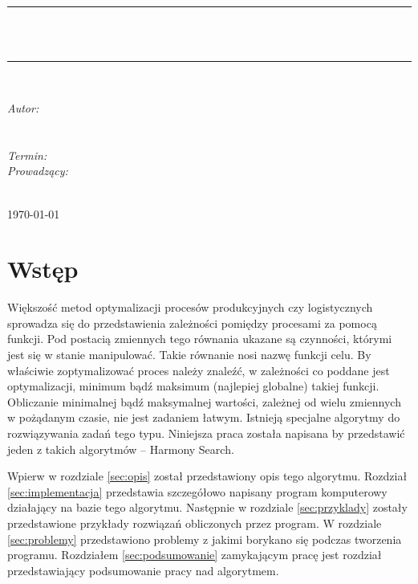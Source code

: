 \documentclass[10pt, a4paper]{article}
\begin{document}
\def\tablename{Tabela}	%
\begin{titlepage}
	\begin{center}
		\textsc{\LARGE \formakursu}\\[1cm]		
		\textsc{\Large \kurs}\\[0.5cm]		
		\rule{\textwidth}{0.08cm}\\[1cm]
		{\huge \bfseries \doctype}\\[1cm]
		\rule{\textwidth}{0.08cm}\\[1cm]
		\begin{flushright} \large
		\emph{Autor: }\\
		\osobaA\\
		\osobaB\\[0.4cm]
		\emph{Termin: }\termin\\[0.4cm]
		\emph{Prowadzący:} \\
		\prowadzacy \\
		\end{flushright}
		\vfill
		{\large \today}
	\end{center}	
\end{titlepage}
\newpage
\tableofcontents
\newpage

\section{Wstęp}
\label{sec:wstep}
Większość metod optymalizacji procesów produkcyjnych czy logistycznych sprowadza się do przedstawienia zależności pomiędzy procesami za pomocą funkcji. Pod postacią zmiennych tego równania ukazane są czynności, którymi jest się w stanie manipulować. Takie równanie nosi nazwę funkcji celu. By właściwie zoptymalizować proces należy znaleźć, w zależności co poddane jest optymalizacji, minimum bądź maksimum (najlepiej globalne) takiej funkcji. Obliczanie minimalnej bądź maksymalnej wartości, zależnej od wielu zmiennych w pożądanym czasie, nie jest zadaniem łatwym. Istnieją specjalne algorytmy do rozwiązywania zadań tego typu. Niniejsza praca została napisana by przedstawić jeden z takich algorytmów -- Harmony Search.

Wpierw w rozdziale \ref{sec:opis} został przedstawiony opis tego algorytmu. Rozdział \ref{sec:implementacja} przedstawia szczegółowo napisany program komputerowy działający na bazie tego algorytmu. Następnie w rozdziale \ref{sec:przyklady} zostały przedstawione przykłady rozwiązań obliczonych przez program. W rozdziale \ref{sec:problemy} przedstawiono problemy z jakimi borykano się podczas tworzenia programu. Rozdziałem \ref{sec:podsumowanie} zamykającym pracę jest rozdział przedstawiający podsumowanie pracy nad algorytmem.
\end{document}
